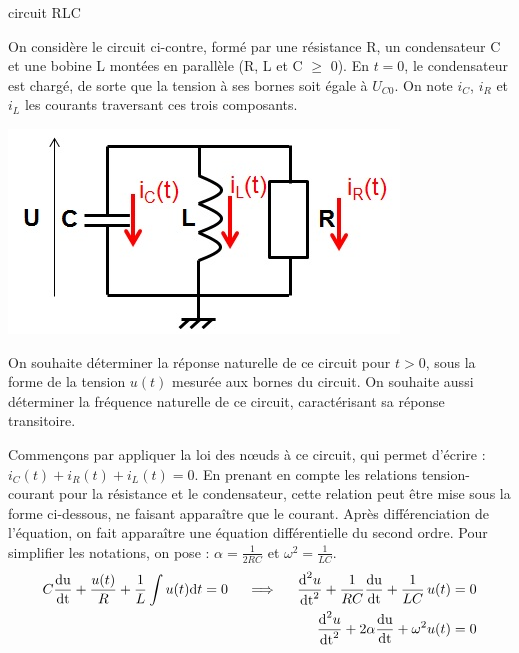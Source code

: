 \begin{remark}{}
        \begin{exemple}{circuit RLC}
          \label{ex:circuit_rlc}
          
          \begin{minipage}[l]{0.7\linewidth}
            On considère le circuit ci-contre, formé par une résistance
            R, un condensateur C et une bobine L montées en parallèle
            (R, L et C $\geq$ 0). En $t= 0$, le condensateur est chargé,
            de sorte que la tension à ses bornes soit égale à
            $U_{C0}$. On note $i_{C}$, $i_{R}$ et $i_{L}$ les courants
            traversant ces trois composants.
          \end{minipage} \hfill
          \begin{minipage}[r]{0.4\linewidth}
            \includegraphics[scale=0.5]{images/circuit_RLC_reponse_naturelle.jpg}
          \end{minipage}
          
          On souhaite déterminer la réponse naturelle de ce circuit pour
          $t > 0$, sous la forme de la tension $u(t)$ mesurée aux bornes du
          circuit. On souhaite aussi déterminer la fréquence naturelle
          de ce circuit, caractérisant sa réponse transitoire.
          
          
          Commençons par appliquer la loi des
          nœuds à ce circuit, qui permet d'écrire :
          $i_{C}(t)+i_{R}(t)+i_{L}(t)=0$. En prenant en compte les
          relations tension-courant pour la résistance et le
          condensateur, cette relation peut être mise sous la forme
          ci-dessous, ne faisant apparaître que le courant. Après
          différenciation de l'équation, on fait apparaître une équation
          différentielle du second ordre. Pour simplifier les notations,
          on pose : $\alpha = \frac{1}{2RC} $ et
          $\omega^{2} = \frac{1}{LC}$.
          \begin{eqnarray*}
            C\frac{\mathrm{d{u}}}{\mathrm{d{t}}}+\frac{u(t)}{R}+\frac{1}{L}\int u(t) \mathrm{d{}} t=0 \;\;\;\;\implies\;\;\;\; \frac{\mathrm{d{}}^{2}u}{{\mathrm{d{t}}}^{2}}+\frac{1}{RC}\frac{\mathrm{d{u}}}{\mathrm{d{t}}}+\frac{1}{LC}\,u(t) = 0\\
            \frac{\mathrm{d{}}^{2}u}{{\mathrm{d{t}}}^{2}} + 2\alpha \frac{\mathrm{d{u}}}{\mathrm{d{t}}}+\omega^{2}u(t) = 0
          \end{eqnarray*}
          

\end{exemple}
\end{remark}
